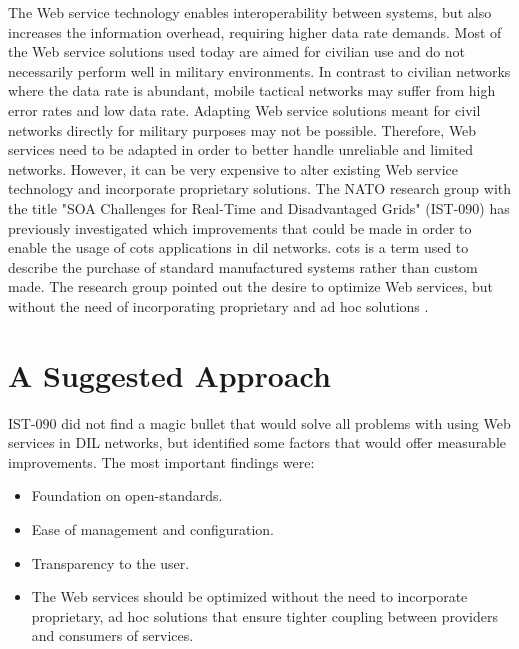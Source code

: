 The Web service technology enables interoperability between systems, but also
increases the information overhead, requiring higher data rate demands. Most of
the Web service solutions used today are aimed for civilian use and do not
necessarily perform well in military environments. In contrast to civilian
networks where the data rate is abundant, mobile tactical networks may suffer
from high error rates and low data rate. Adapting Web service solutions meant
for civil networks directly for military purposes may not be possible.
Therefore, Web services need to be adapted in order to better handle unreliable
and limited networks. However, it can be very expensive to alter existing Web
service technology and incorporate proprietary solutions. The NATO research
group with the title "SOA Challenges for Real-Time and Disadvantaged Grids"
(IST-090) has previously investigated which improvements that could be made in
order to enable the usage of \gls{cots} applications in \gls{dil} networks.
\Gls{cots} is a term used to describe the purchase of standard manufactured
systems rather than custom made. The research group pointed out the desire to
optimize Web services, but without the need of incorporating proprietary and ad
hoc solutions \cite{ist-090}.


\section{A Suggested Approach}
\label{section:hypothesis}

IST-090 did not find a magic bullet that would solve all problems with using Web
services in DIL networks, but identified some factors that would offer measurable
improvements. The most important findings were:

\begin{itemize}

    \item Foundation on open-standards.

    \item Ease of management and configuration.

    \item Transparency to the user.

    \item The Web services should be optimized without the need to incorporate
    proprietary, ad hoc solutions that ensure tighter coupling between providers
    and consumers of services.

\end{itemize}

